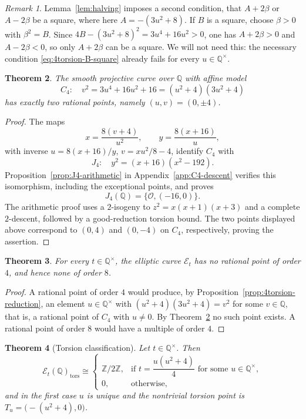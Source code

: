 \documentclass[11pt,a4paper]{amsart}
\newtheorem{theorem}{Theorem}[section]
\theoremstyle{definition}
\theoremstyle{remark}
\newtheorem{remark}[theorem]{Remark}
\numberwithin{equation}{section}
\newcommand{\Q}{\mathbb{Q}}
\newcommand{\Z}{\mathbb{Z}}
\newcommand{\mathcalE}{\mathcal{E}}
\begin{document}
\begin{remark}\label{rem:4torsion-second-condition}
Lemma~\ref{lem:halving} imposes a second condition, that $A+2\beta$ or $A-2\beta$ be a square, where here $A=-(3u^2+8)$. If $B$ is a square, choose $\beta>0$ with $\beta^2=B$. Since $4B-(3u^2+8)^2=3u^4+16u^2>0$, one has $A+2\beta>0$ and $A-2\beta<0$, so only $A+2\beta$ can be a square. We will not need this: the necessary condition \eqref{eq:4torsion-B-square} already fails for every $u\in\Q^\times$.
\end{remark}

\begin{theorem}\label{thm:C4-points}
The smooth projective curve over $\Q$ with affine model
\[
C_4:\quad v^2=3u^4+16u^2+16=(u^2+4)(3u^2+4)
\]
has exactly two rational points, namely $(u,v)=(0,\pm4)$.
\end{theorem}

\begin{proof}
The maps
\begin{equation}\label{eq:C4-to-J4}
x=\frac{8(v+4)}{u^2},\qquad y=\frac{8(x+16)}{u},
\end{equation}
with inverse $u=8(x+16)/y$, $v=xu^2/8-4$, identify $C_4$ with
\[
J_4:\quad y^2=(x+16)(x^2-192).
\]
Proposition~\ref{prop:J4-arithmetic} in Appendix~\ref{app:C4-descent}
verifies this isomorphism, including the exceptional points, and proves
\[
J_4(\Q)=\{\mathcal O,(-16,0)\}.
\]
The arithmetic proof uses a $2$-isogeny to $z^2=x(x+1)(x+3)$ and a
complete $2$-descent, followed by a good-reduction torsion bound.
The two points displayed above correspond to $(0,4)$ and $(0,-4)$ on
$C_4$, respectively, proving the assertion.
\end{proof}

\begin{theorem}\label{thm:no-4-torsion}
For every $t\in\Q^\times$, the elliptic curve $\mathcalE_t$ has no rational point of order $4$, and hence none of order $8$.
\end{theorem}

\begin{proof}
A rational point of order $4$ would produce, by Proposition~\ref{prop:4torsion-reduction}, an element $u\in\Q^\times$ with $(u^2+4)(3u^2+4)=v^2$ for some $v\in\Q$, that is, a rational point of $C_4$ with $u\neq0$. By Theorem~\ref{thm:C4-points} no such point exists. A rational point of order $8$ would have a multiple of order $4$.
\end{proof}

\begin{theorem}[Torsion classification]\label{thm:torsion-classification}
Let $t\in\Q^\times$. Then
\[
\mathcalE_t(\Q)_{\mathrm{tors}}\cong
\begin{cases}
\Z/2\Z, & \text{if } t=\dfrac{u(u^2+4)}{4} \text{ for some } u\in\Q^\times,\\[1.5ex]
0, & \text{otherwise,}
\end{cases}
\]
and in the first case $u$ is unique and the nontrivial torsion point is $T_u=\bigl(-(u^2+4),0\bigr)$.
\end{theorem}
\end{document}
